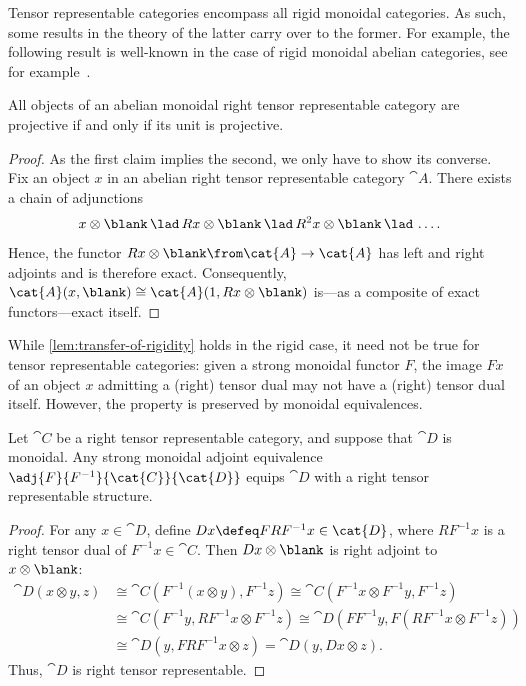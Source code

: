 Tensor representable categories encompass all rigid monoidal categories.
As such, some results in the theory of the latter carry over to the former.
For example, the following result is well-known in the case of rigid monoidal abelian categories,
see for example~\cite[Corollary~4.2.13]{Etingof2015}.

\begin{lemma}\label{lem:projectivity-in-tr-cats}
  All objects of an abelian monoidal right tensor representable category are projective
  if and only if its unit is projective.
\end{lemma}
\begin{proof}
  As the first claim implies the second, we only have to show its converse.
  Fix an object \(x\) in an abelian right tensor representable category \(\cat{A}\).
  There exists a chain of adjunctions
  \[
    x \otimes \blank \,\lad\, Rx \otimes \blank \,\lad\, R^2x \otimes \blank \,\lad\, \dots.
  \]
  Hence, the functor \(Rx \otimes \blank \from \cat{A} \to\cat{A}\) has left and right adjoints and is therefore exact.
  Consequently, \(\cat{A}(x, \blank) \cong \cat{A}(1, Rx \otimes \blank)\) is—as a composite of exact functors—exact itself.
\end{proof}

While \cref{lem:transfer-of-rigidity} holds in the rigid case,
it need not be true for tensor representable categories:
given a strong monoidal functor \(F\),
the image \(Fx\) of an object \(x\) admitting a (right) tensor dual may not have a (right) tensor dual itself.
However, the property is preserved by monoidal equivalences.

\begin{lemma}\label{lem:transfer-of-tensor-rep}
  Let \(\cat{C}\) be a right tensor representable category,
  and suppose that \(\cat{D}\) is monoidal.
  Any strong monoidal adjoint equivalence
  \(\adj{F}{F^{-1}}{\cat{C}}{\cat{D}}\)
  equips \(\cat{D}\) with a right tensor representable structure.
\end{lemma}
\begin{proof}
  For any \(x \in \cat{D}\), define \(Dx \defeq FRF^{-1}x \in\cat{D}\),
  where \(RF^{-1}x\) is a right tensor dual of \(F^{-1}x\in\cat{C}\).
  Then \(Dx \otimes \blank\) is right adjoint to \(x \otimes \blank\):
  \begin{align*}
    \cat{D}(x \otimes y, z)
    & \cong \cat{C}(F^{-1}(x \otimes y), F^{-1}z)
      \cong \cat{C}(F^{-1}x \otimes F^{-1}y, F^{-1}z) \\
    & \cong \cat{C}(F^{-1}y, RF^{-1}x \otimes F^{-1}z)
      \cong \cat{D}(FF^{-1}y, F(RF^{-1}x \otimes F^{-1}z)) \\
    & \cong \cat{D}(y, FRF^{-1}x \otimes z)
      = \cat{D}(y, Dx \otimes z).
  \end{align*}
  Thus, \(\cat{D}\) is right tensor representable.
\end{proof}

